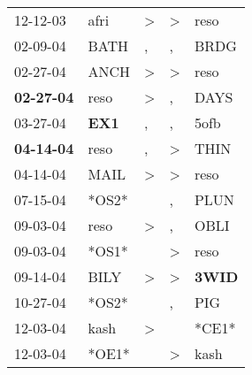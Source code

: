 \begin{supertabular}{p{0.07\textwidth}p{0.06\textwidth}p{0.02\textwidth}p{0.02\textwidth}p{0.06\textwidth}}
          12-12-03\textsuperscript{} &           afri\textsuperscript{} &     \textgreater &     \textgreater &           reso\textsuperscript{} \\
          02-09-04\textsuperscript{} &           BATH\textsuperscript{} &                , &                , &           BRDG\textsuperscript{} \\
          02-27-04\textsuperscript{} &           ANCH\textsuperscript{} &     \textgreater &     \textgreater &           reso\textsuperscript{} \\
 \textbf{02-27-04\textsuperscript{}} &           reso\textsuperscript{} &     \textgreater &                , &           DAYS\textsuperscript{} \\
          03-27-04\textsuperscript{} &   \textbf{EX1\textsuperscript{}} &                , &                , &           5ofb\textsuperscript{} \\
 \textbf{04-14-04\textsuperscript{}} &           reso\textsuperscript{} &                , &     \textgreater &           THIN\textsuperscript{} \\
          04-14-04\textsuperscript{} &           MAIL\textsuperscript{} &     \textgreater &     \textgreater &           reso\textsuperscript{} \\
          07-15-04\textsuperscript{} &                            *OS2* &                  &                , &           PLUN\textsuperscript{} \\
          09-03-04\textsuperscript{} &           reso\textsuperscript{} &     \textgreater &                , &           OBLI\textsuperscript{} \\
          09-03-04\textsuperscript{} &                            *OS1* &                  &     \textgreater &           reso\textsuperscript{} \\
          09-14-04\textsuperscript{} &           BILY\textsuperscript{} &     \textgreater &     \textgreater &  \textbf{3WID\textsuperscript{}} \\
          10-27-04\textsuperscript{} &                            *OS2* &                  &                , &            PIG\textsuperscript{} \\
          12-03-04\textsuperscript{} &           kash\textsuperscript{} &     \textgreater &                  &                            *CE1* \\
          12-03-04\textsuperscript{} &                            *OE1* &                  &     \textgreater &           kash\textsuperscript{} \\

\end{supertabular}
